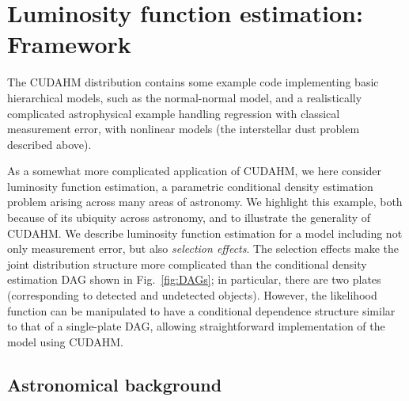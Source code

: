 \section{Luminosity function estimation: Framework}
\label{sec:lum_func}

The CUDAHM distribution contains some example code implementing basic hierarchical models, such as the normal-normal model, and a realistically complicated astrophysical example handling regression with classical measurement error, with nonlinear models (the interstellar dust problem described above).

As a somewhat more complicated application of CUDAHM, we here consider luminosity function estimation, a parametric conditional density estimation problem arising across many areas of astronomy.
We highlight this example, both because of its ubiquity across astronomy, and to illustrate the generality of CUDAHM.
We describe luminosity function estimation for a model including not only measurement error, but also \emph{selection effects}.
The selection effects make the joint distribution structure more complicated than the conditional density estimation DAG shown in Fig.~\ref{fig:DAGs}; in particular, there are two plates (corresponding to detected and undetected objects).
However, the likelihood function can be manipulated to have a conditional dependence structure similar to that of a single-plate DAG, allowing straightforward implementation of the model using CUDAHM.

\subsection{Astronomical background}
\label{sec:LF-astro}

